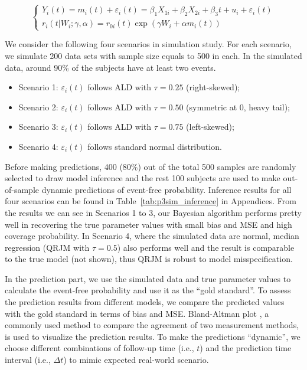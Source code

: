 \begin{equation}\label{eqn:p3simjoint}
\left\{
\begin{array}{l}
Y_{i}(t) = m_i(t) + \varepsilon_{i}(t) = \beta_1X_{1i} + \beta_2X_{2i} + \beta_3t + u_i + \varepsilon_{i}(t)\\
r_i(t|W_i;  \gamma, \alpha) = r_{0i}(t)\exp(\gamma W_i + \alpha m_i(t))
\end{array}
\right.
\end{equation}

We consider the following four scenarios in simulation study. For each scenario, we simulate 200 data sets with sample size equals to 500 in each. In the simulated data, around 90\% of the subjects have at least two events.
\begin{itemize}
\item Scenario 1: $\varepsilon_{i}(t)$ follows ALD with $\tau=0.25$ (right-skewed);
\item Scenario 2: $\varepsilon_{i}(t)$ follows ALD with $\tau=0.50$ (symmetric at 0, heavy tail);
\item Scenario 3: $\varepsilon_{i}(t)$ follows ALD with $\tau=0.75$ (left-skewed);
\item Scenario 4: $\varepsilon_{i}(t)$ follows standard normal distribution.
\end{itemize}

Before making predictions, 400 (80\%) out of the total 500 samples are randomly selected to draw model inference and the rest 100 subjects are used to make out-of-sample dynamic predictions of event-free probability. Inference results for all four scenarios can be found in Table~\ref{tab:p3sim_inference} in Appendices. From the results we can see in Scenarios 1 to 3, our Bayesian algorithm performs pretty well in recovering the true parameter values with small bias and MSE and high coverage probability. In Scenario 4, where the simulated data are normal, median regression (QRJM with $\tau=0.5$) also performs well and the result is comparable to the true model (not shown), thus QRJM is robust to model misspecification.

In the prediction part, we use the simulated data and true parameter values to calculate the event-free probability and use it as the ``gold standard''. To assess the prediction results from different models, we compare the predicted values with the gold standard in terms of bias and MSE. Bland-Altman plot \citep{bland1986statistical}, a commonly used method to compare the agreement of two measurement methods, is used to visualize the prediction results. To make the predictions ``dynamic'', we choose different combinations of follow-up time (i.e., $t$) and the prediction time interval (i.e., $\Delta t$) to mimic expected real-world scenario.

